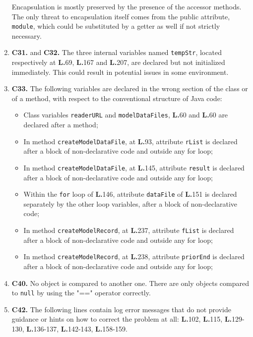 \begin{enumerate}
Encapsulation is mostly preserved by the presence of the accessor methods. The only threat to encapsulation itself comes from the public attribute, \texttt{module}, which could be substituted by a getter as well if not strictly necessary.
\item \textbf{C31.} and \textbf{C32.} The three internal variables named \texttt{tempStr}, located respectively at \textbf{L.}69, \textbf{L.}167 and \textbf{L.}207, are declared but not initialized immediately. This could result in potential issues in some environment.
\item \textbf{C33.} The following variables are declared in the wrong section of the class or of a method, with respect to the conventional structure of Java code:
	\begin{itemize}
	\item Class variables \texttt{readerURL} and \texttt{modelDataFiles}, \textbf{L.}60 and \textbf{L.}60 are declared after a method;
	\item In method \texttt{createModelDataFile}, at \textbf{L.}93, attribute \texttt{rList} is declared after a block of non-declarative code and outside any for loop;
	\item In method \texttt{createModelDataFile}, at \textbf{L.}145, attribute \texttt{result} is declared after a block of non-declarative code and outside any for loop;
	\item Within the \texttt{for} loop of \textbf{L.}146, attribute \texttt{dataFile} of \textbf{L.}151 is declared separately by the other loop variables, after a block of non-declarative code;
	\item In method \texttt{createModelRecord}, at \textbf{L.}237, attribute \texttt{fList} is declared after a block of non-declarative code and outside any for loop;
	\item In method \texttt{createModelRecord}, at \textbf{L.}238, attribute \texttt{priorEnd} is declared after a block of non-declarative code and outside any for loop;
	\end{itemize}
\item \textbf{C40.} No object is compared to another one. There are only objects compared to \texttt{null} by using the "==" operator correctly.
\item \textbf{C42.} The following lines contain log error messages that do not provide guidance or hints on how to correct the problem at all: \textbf{L.}102, \textbf{L.}115, \textbf{L.}129-130, \textbf{L.}136-137, \textbf{L.}142-143, \textbf{L.}158-159.
\end{enumerate}

